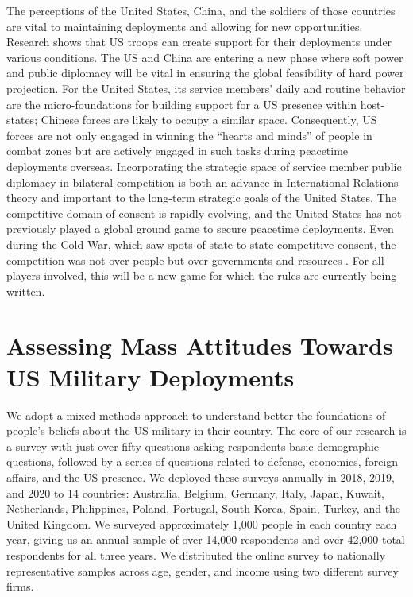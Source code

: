 The perceptions of the United States, China, and the soldiers of those countries are vital to maintaining deployments and allowing for new opportunities. Research shows that US troops can create support for their deployments under various conditions.  The US and China are entering a new phase where soft power and public diplomacy will be vital in ensuring the global feasibility of hard power projection.\autocite{Trunkos2020} For the United States, its service members' daily and routine behavior are the micro-foundations for building support for a US presence within host-states; Chinese forces are likely to occupy a similar space. Consequently, US forces are not only engaged in winning the ``hearts and minds'' of people in combat zones but are actively engaged in such tasks during peacetime deployments overseas. Incorporating the strategic space of service member public diplomacy in bilateral competition is both an advance in International Relations theory and important to the long-term strategic goals of the United States. The competitive domain of consent is rapidly evolving, and the United States has not previously played a global ground game to secure peacetime deployments. Even during the Cold War, which saw spots of state-to-state competitive consent, the competition was not over people but over governments and resources \cite{Harkavy1982,Harkavy1989,calder2007}. For all players involved, this will be a new game for which the rules are currently being written. 




\section*{Assessing Mass Attitudes Towards US Military Deployments}


We adopt a mixed-methods approach to understand better the foundations of people's beliefs about the US military in their country. The core of our research is a survey with just over fifty questions asking respondents basic demographic questions, followed by a series of questions related to defense, economics, foreign affairs, and the US presence. We deployed these surveys annually in 2018, 2019, and 2020 to 14 countries: Australia, Belgium, Germany, Italy, Japan, Kuwait, Netherlands, Philippines, Poland, Portugal, South Korea, Spain, Turkey, and the United Kingdom. We surveyed approximately 1,000 people in each country each year, giving us an annual sample of over 14,000 respondents and over 42,000 total respondents for all three years. We distributed the online survey to nationally representative samples across age, gender, and income using two different survey firms. 

